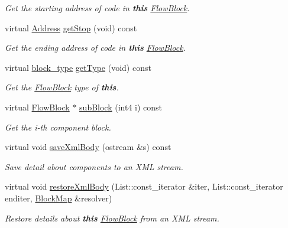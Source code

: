 \begin{DoxyCompactItemize}
\begin{DoxyCompactList}\small\item\em Get the starting address of code in {\bfseries{this}} \mbox{\hyperlink{class_flow_block}{Flow\+Block}}. \end{DoxyCompactList}\item 
virtual \mbox{\hyperlink{class_address}{Address}} \mbox{\hyperlink{class_block_basic_af9fb755c152296c5f3110e9dc0f51bd3}{get\+Stop}} (void) const
\begin{DoxyCompactList}\small\item\em Get the ending address of code in {\bfseries{this}} \mbox{\hyperlink{class_flow_block}{Flow\+Block}}. \end{DoxyCompactList}\item 
virtual \mbox{\hyperlink{class_flow_block_a70df78390870fcdd51e31426ba6a193e}{block\+\_\+type}} \mbox{\hyperlink{class_block_basic_aeb3a61f4e372495d0644f56c5c20f974}{get\+Type}} (void) const
\begin{DoxyCompactList}\small\item\em Get the \mbox{\hyperlink{class_flow_block}{Flow\+Block}} type of {\bfseries{this}}. \end{DoxyCompactList}\item 
virtual \mbox{\hyperlink{class_flow_block}{Flow\+Block}} $\ast$ \mbox{\hyperlink{class_block_basic_a1456fa3eb84ffa14650ff6e216eaa43d}{sub\+Block}} (int4 i) const
\begin{DoxyCompactList}\small\item\em Get the i-\/th component block. \end{DoxyCompactList}\item 
virtual void \mbox{\hyperlink{class_block_basic_aec6c3cb9b136472b012a6d39e516efaa}{save\+Xml\+Body}} (ostream \&s) const
\begin{DoxyCompactList}\small\item\em Save detail about components to an X\+ML stream. \end{DoxyCompactList}\item 
virtual void \mbox{\hyperlink{class_block_basic_ae2147a1a73714a1592dfb3e43821c3ef}{restore\+Xml\+Body}} (List\+::const\+\_\+iterator \&iter, List\+::const\+\_\+iterator enditer, \mbox{\hyperlink{class_block_map}{Block\+Map}} \&resolver)
\begin{DoxyCompactList}\small\item\em Restore details about {\bfseries{this}} \mbox{\hyperlink{class_flow_block}{Flow\+Block}} from an X\+ML stream. \end{DoxyCompactList}\item 

\end{DoxyCompactItemize}

